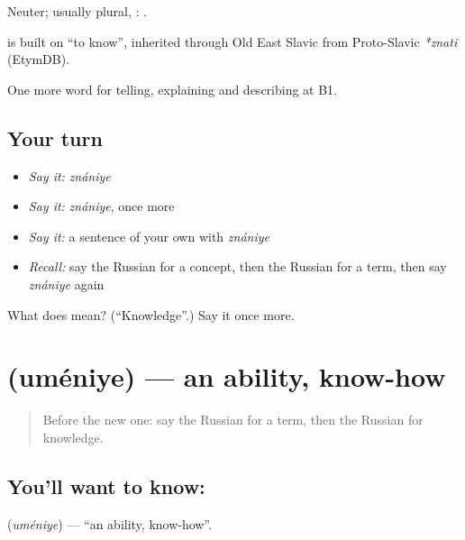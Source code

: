 Neuter; usually plural, \emph{}: \emph{ }.

\begin{cousinweb}
\textbf{} is built on \emph{} \textquotedblleft{}to know\textquotedblright{}, inherited through Old East Slavic from Proto-Slavic \emph{*znati} (EtymDB).
\end{cousinweb}

\begin{grammarlens}[title={What you've built}]
One more word for telling, explaining and describing at B1.
\end{grammarlens}

\subsection*{Your turn}
\begin{itemize}
\raggedright
  \item \emph{Say it:} \emph{znániye}
  \item \emph{Say it:} \emph{znániye}, once more
  \item \emph{Say it:} a sentence of your own with \emph{znániye}
  \item \emph{Recall:} say the Russian for a concept, then the Russian for a term, then say \emph{znániye} again
\end{itemize}

\begin{tcolorbox}[breakable,colback=teal!4,colframe=teal!35!black,title={Before you move on}]
What does  mean? (\textquotedblleft{}Knowledge\textquotedblright{}.) Say it once more.
\end{tcolorbox}
\section[\texorpdfstring{\ru{умение} (uméniye)}{умение (uméniye)}]{ (uméniye) — an ability, know-how}

\label{lesson:RU-C387-umenie}



\begin{quote}
Before the new one: say the Russian for a term, then the Russian for knowledge.
\end{quote}

\subsection*{You'll want to know: }
\textbf{} (\emph{uméniye}) — \textquotedblleft{}an ability, know-how\textquotedblright{}.

